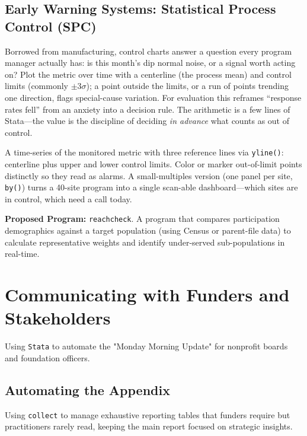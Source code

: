 \documentclass[
    a4paper,
    fontsize=10pt,
    twoside=true,
    numbers=noenddot,
]{kaobook}
\providecommand{\Environment}[1]{\texttt{#1}}
\newenvironment{vizcallout}[1][Visualization to build]{%
    \begin{vizbox}[frametitle={#1}]%
}{%
    \end{vizbox}%
}
\begin{document}
\subsection{Early Warning Systems: Statistical Process Control (SPC)}
Borrowed from manufacturing, control charts answer a question every program manager actually has: is this month's dip normal noise, or a signal worth acting on? Plot the metric over time with a centerline (the process mean) and control limits (commonly $\pm 3\sigma$); a point outside the limits, or a run of points trending one direction, flags special-cause variation. For evaluation this reframes \enquote{response rates fell} from an anxiety into a decision rule. The arithmetic is a few lines of Stata---the value is the discipline of deciding \emph{in advance} what counts as out of control.

\begin{vizcallout}[Visualization to build: the control chart]
A time-series of the monitored metric with three reference lines via \texttt{yline()}: centerline plus upper and lower control limits. Color or marker out-of-limit points distinctly so they read as alarms. A small-multiples version (one panel per site, \texttt{by()}) turns a 40-site program into a single scan-able dashboard---which sites are in control, which need a call today.
\end{vizcallout}

\begin{kaobox}[frametitle=Ado-file Idea: \texttt{reachcheck}]
\textbf{Proposed Program:} \texttt{reachcheck}. A program that compares participation demographics against a target population (using Census or parent-file data) to calculate representative weights and identify under-served sub-populations in real-time.
\end{kaobox}

\section{Communicating with Funders and Stakeholders}
Using \Environment{Stata} to automate the "Monday Morning Update" for nonprofit boards and foundation officers.

\subsection{Automating the Appendix}
Using \texttt{collect} to manage exhaustive reporting tables that funders require but practitioners rarely read, keeping the main report focused on strategic insights.
\end{document}
